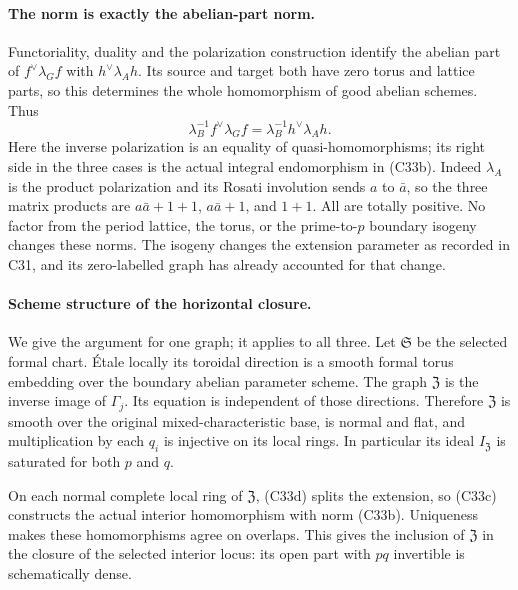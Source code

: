 \documentclass[11pt]{article}
\theoremstyle{definition}\newtheorem{definition}[theorem]{Definition}\newtheorem{remark}[theorem]{Remark}
\begin{document}
\paragraph{The norm is exactly the abelian-part norm.}
Functoriality, duality and the polarization construction
identify the abelian part of $f^\vee\lambda_G f$ with
$h^\vee\lambda_Ah$. Its source and target both have
zero torus and lattice parts, so this determines the
whole homomorphism of good abelian schemes. Thus
\[
       \lambda_B^{-1}f^\vee\lambda_Gf
          =\lambda_B^{-1}h^\vee\lambda_Ah.              \tag{C33e}
\]
Here the inverse polarization is an equality of
quasi-homomorphisms; its right side in the three
cases is the actual integral endomorphism in
(C33b). Indeed $\lambda_A$ is the product
polarization and its Rosati involution sends
$a$ to $\bar a$, so the three matrix products
are $a\bar a+1+1$, $a\bar a+1$, and $1+1$.
All are totally positive. No factor from the
period lattice, the torus, or the prime-to-$p$
boundary isogeny changes these norms. The
isogeny changes the extension parameter as
recorded in C31, and its zero-labelled graph
has already accounted for that change.

\paragraph{Scheme structure of the horizontal closure.}
We give the argument for one graph; it applies to
all three. Let $\mathfrak S$ be the selected formal
chart. \'Etale locally its toroidal direction is a
smooth formal torus embedding over the boundary
abelian parameter scheme. The graph $\mathfrak Z$
is the inverse image of $\Gamma_j$. Its equation
is independent of those directions. Therefore
$\mathfrak Z$ is smooth over the original
mixed-characteristic base, is normal and flat,
and multiplication by each $q_i$ is injective
on its local rings. In particular its ideal
$I_{\mathfrak Z}$ is saturated for both $p$
and $q$.

On each normal complete local ring of
$\mathfrak Z$, (C33d) splits the extension,
so (C33c) constructs the actual interior
homomorphism with norm (C33b). Uniqueness
makes these homomorphisms agree on overlaps.
This gives the inclusion of $\mathfrak Z$
in the closure of the selected interior
locus: its open part with $pq$ invertible
is schematically dense.
\end{document}
